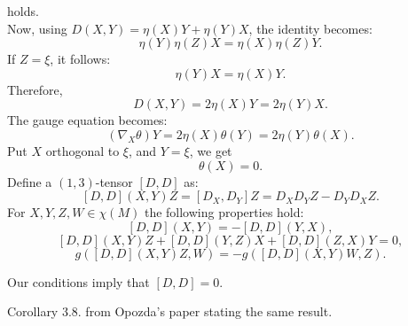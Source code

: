 holds.\\
Now, using $D(X,Y)=\eta(X)Y+\eta(Y)X$, the identity becomes:
$$\eta(Y)\eta(Z)X=\eta(X)\eta(Z)Y.$$
If $Z=\xi$, it follows:
$$\eta(Y)X=\eta(X)Y.$$
Therefore, 
$$D(X,Y)=2\eta(X)Y=2\eta(Y)X.$$
The gauge equation becomes:
$$(\nabla_X\theta)Y=2\eta(X)\theta(Y)=2\eta(Y)\theta(X).$$
Put $X$ orthogonal to $\xi$, and $Y=\xi$, we get 
$$\theta(X)=0.$$
Define a $(1,3)$-tensor $[D,D]$ as:
$$[D,D](X,Y)Z=[D_X,D_Y]Z=D_XD_YZ-D_YD_XZ.$$
For $X,Y,Z,W\in\chi(M)$ the following properties hold:
$$[D,D](X,Y)=-[D,D](Y,X),$$
$$[D,D](X,Y)Z+[D,D](Y,Z)X+[D,D](Z,X)Y=0,$$
$$g([D,D](X,Y)Z,W)=-g([D,D](X,Y)W,Z).$$
\begin{prop}
Our conditions imply that $[D,D]=0.$
\end{prop}
Corollary 3.8. from Opozda's paper stating the same result.


